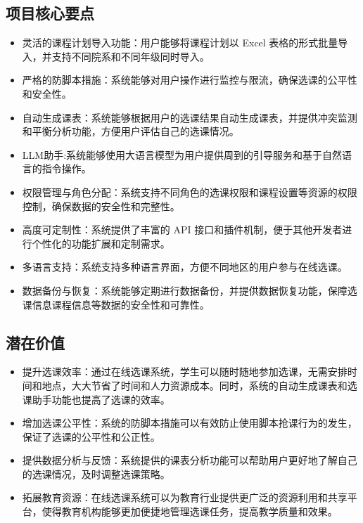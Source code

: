 \documentclass{article}
\begin{document}
\subsection{项目核心要点}
\begin{itemize}
	\item 灵活的课程计划导入功能：用户能够将课程计划以 Excel 表格的形式批量导入，并支持不同院系和不同年级同时导入。
	\item 严格的防脚本措施：系统能够对用户操作进行监控与限流，确保选课的公平性和安全性。
	\item 自动生成课表：系统能够根据用户的选课结果自动生成课表，并提供冲突监测和平衡分析功能，方便用户评估自己的选课情况。
	\item LLM助手:系统能够使用大语言模型为用户提供周到的引导服务和基于自然语言的指令操作。
	\item 权限管理与角色分配：系统支持不同角色的选课权限和课程设置等资源的权限控制，确保数据的安全性和完整性。
	\item 高度可定制性：系统提供了丰富的 API 接口和插件机制，便于其他开发者进行个性化的功能扩展和定制需求。
	\item 多语言支持：系统支持多种语言界面，方便不同地区的用户参与在线选课。
	\item 数据备份与恢复：系统能够定期进行数据备份，并提供数据恢复功能，保障选课信息课程信息等数据的安全性和可靠性。
\end{itemize}

\subsection{潜在价值}
\begin{itemize}
	\item 提升选课效率：通过在线选课系统，学生可以随时随地参加选课，无需安排时间和地点，大大节省了时间和人力资源成本。同时，系统的自动生成课表和选课助手功能也提高了选课的效率。
	\item 增加选课公平性：系统的防脚本措施可以有效防止使用脚本抢课行为的发生，保证了选课的公平性和公正性。
	\item 提供数据分析与反馈：系统提供的课表分析功能可以帮助用户更好地了解自己的选课情况，及时调整选课策略。
	\item 拓展教育资源：在线选课系统可以为教育行业提供更广泛的资源利用和共享平台，使得教育机构能够更加便捷地管理选课任务，提高教学质量和效果。
\end{itemize}
\end{document}
